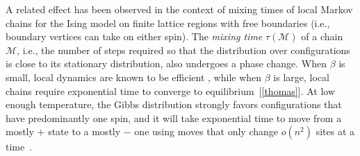 \documentclass[letterpaper,english,numberwithinsect]{amsart}
\begin{document}
A related effect
has been observed in the context of mixing times of local Markov chains for the Ising model on finite lattice regions with free boundaries (i.e., boundary vertices can take on either spin).
The {\it mixing time} $\tau({\mathcal M})$ of a chain ${\mathcal{M}}$, i.e., the number of
steps required so that the  distribution over configurations
is close to its stationary distribution, also undergoes 
a  phase change. 
When $\beta$ is  small, local
dynamics are known to be efficient \cite{mo1,  mo2, lmst}, while when $\beta$ is large, local
chains require exponential time to converge to equilibrium~[\ref{thomas}]. 
At low enough temperature, the Gibbs
distribution strongly favors configurations that have predominantly one
spin, and it will take exponential time to move from a mostly $+$ state to a mostly
$-$ one using moves that only change $o(n^2)$ sites at a time~\cite{mart}.

\end{document}
